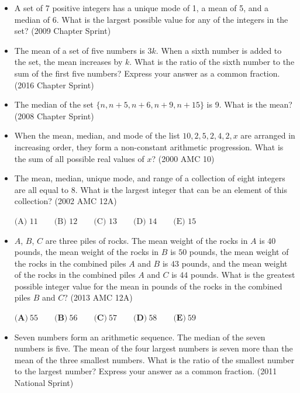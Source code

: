 \documentclass{article}
\begin{document}
\begin{itemize}

\item A set of 7 positive integers has a unique mode of 1, a mean of 5, and a median of 6. What is the largest possible value for any of the integers in the set? (2009 Chapter Sprint)

\item The mean of a set of five numbers is $3k$. When a sixth number is added to the set, the mean increases by $k$. What is the ratio of the sixth number to the sum of the first five numbers? Express your answer as a common fraction. (2016 Chapter Sprint)

\item The median of the set $\{ n, n+5, n+6, n+9, n+15\}$ is 9. What is the mean? (2008 Chapter Sprint)

\item When the mean, median, and mode of the list $10, 2, 5, 2, 4, 2, x$ are arranged in increasing order, they form a non-constant arithmetic progression. What is the sum of all possible real values of $x$? (2000 AMC 10)

\item The mean, median, unique mode, and range of a collection of eight integers are all equal to 8. What is the largest integer that can be an element of this collection? (2002 AMC 12A)

$
\text{(A) }11
\qquad
\text{(B) }12
\qquad
\text{(C) }13
\qquad
\text{(D) }14
\qquad
\text{(E) }15
$

\item $A$, $B$, $C$ are three piles of rocks. The mean weight of the rocks in $A$ is $40$ pounds, the mean weight of the rocks in $B$ is $50$ pounds, the mean weight of the rocks in the combined piles $A$ and $B$ is $43$ pounds, and the mean weight of the rocks in the combined piles $A$ and $C$ is $44$ pounds. What is the greatest possible integer value for the mean in pounds of the rocks in the combined piles $B$ and $C$? (2013 AMC 12A)

$ \textbf{(A)} \ 55 \qquad \textbf{(B)} \ 56 \qquad \textbf{(C)} \ 57 \qquad \textbf{(D)} \ 58 \qquad \textbf{(E)} \ 59$ 

\item Seven numbers form an arithmetic sequence. The median of the seven numbers is five. The mean of the four largest numbers is seven more than the mean of the three smallest numbers. What is the ratio of the smallest number to the largest number? Express your answer as a common fraction. (2011 National Sprint)


\end{itemize}
\end{document}
